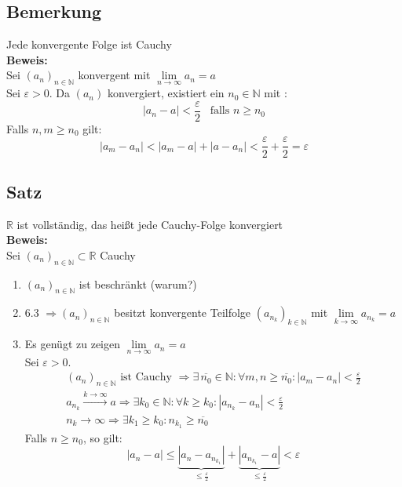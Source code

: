 \subsection{Bemerkung} %
\label{sub:bemerkung}
Jede konvergente Folge ist Cauchy 
\vspace{\baselineskip} \\
\textbf{Beweis:}  \\
Sei $(a_n)_{n \in \mathds{N}}$ konvergent mit $\lim\limits_{n \to \infty} a_n = a$ \\
Sei $\varepsilon >0$. Da $(a_n)$ konvergiert, existiert ein $n_0 \in \mathds{N}$ mit : 
\[
	|a_n -a| < \frac{\varepsilon}{2} \enspace \text{ falls } n \geq n_0
\]
Falls $n,m \geq n_0$ gilt:
\[
	|a_m -a_n| < |a_m -a| + |a- a_n| < \frac{\varepsilon}{2} + \frac{\varepsilon}{2} = \varepsilon
\]

\subsection{Satz} %
\label{sub:satz}
$\mathds{R}$ ist vollständig, das heißt jede Cauchy-Folge konvergiert
\vspace{\baselineskip} \\
\textbf{Beweis:}\\
Sei $(a_n)_{n \in \mathds{N}} \subset \mathds{R}$ Cauchy
\begin{enumerate}[1.]
	\item $(a_n)_{n \in \mathds{N}}$ ist beschränkt (warum?)
	\item 6.3 $\Rightarrow (a_n)_{n \in \mathds{N}}$ besitzt konvergente Teilfolge $(a_{n_k})_{k \in \mathds{N}}$ mit $\lim\limits_{k \to \infty} a_{n_k} = a$
	\item Es genügt zu zeigen $\lim\limits_{n \to \infty} a_n = a$ \\
	Sei $\varepsilon >0$. 
	\begin{gather*}
		(a_n)_{n \in \mathds{N}} \text{ ist Cauchy } \Rightarrow \exists \, \overline{n_0} \in \mathds{N} 
		: \forall m,n \geq  \overline{n_0} : |a_m - a_n| < \frac{\varepsilon}{2} \\
		a_{n_k} \xrightarrow{k \to \infty} a  \Rightarrow \exists k_0 \in \mathds{N} : \forall k \geq k_0 : |a_{n_k} - a_n| < \frac{\varepsilon}{2} \\
		n_k \to \infty \Rightarrow \exists k_1 \geq k_0 : n_{k_1} \geq  \overline{n_0}
	\end{gather*}
	Falls $n \geq n_0$, so gilt:
	\[
		|a_n -a| \leq \underbrace{\left|a_n - a_{n_{k_1}} \right|}_{\leq \frac{\varepsilon}{2}} 
		+ \underbrace{\left|a_{n_{k_1}} -a\right|}_{\leq \frac{\varepsilon}{2}} < \varepsilon
	\]
\end{enumerate}

